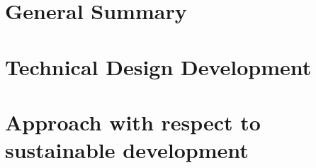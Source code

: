 \documentclass[11pt]{report}
\begin{document}
%
%



%
%



%
%

\tableofcontents

%
%

\chapter{General Summary}
\label{dseSummary}






%
%

\chapter{Technical Design Development}
\label{dse}






%
%

\chapter{Approach with respect to sustainable development}
\label{dseSustainable}



%
%
\end{document}
